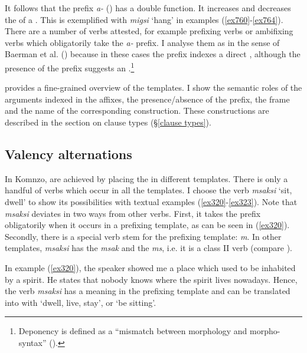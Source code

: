 It follows that the  prefix \emph{a-} (\Vc) has a double function. It increases and decreases the  of a . This is exemplified with \emph{migsi} `hang' in examples (\ref{ex760}-\ref{ex764}). There are a number of  verbs attested, for example prefixing verbs or  ambifixing verbs which obligatorily take the \emph{a-} prefix. I analyse them as  in the sense of Baerman et al. (\citeyear{Baerman:2006depo}) because in these cases the  prefix indexes a direct , although the presence of the {\Vc} prefix suggests an .\footnote{Deponency is defined as a ``mismatch between morphology and morpho-syntax'' (\citealt{Baerman:2006depo}).}

 provides a fine-grained overview of the templates. I show the semantic roles of the arguments indexed in the affixes, the presence/absence of the  prefix, the  frame and the name of the corresponding construction. These constructions are described in the section on clause types (\S\ref{clause types}).

\subsection{Valency alternations} \label{valencyalternations}

In Komnzo,  are achieved by placing the  in different templates. There is only a handful of verbs which occur in all the templates. I choose the verb \emph{msaksi} `sit, dwell' to show its possibilities with textual examples (\ref{ex320}-\ref{ex323}). Note that \emph{msaksi} deviates in two ways from other verbs. First, it takes the  prefix obligatorily when it occurs in a prefixing template, as can be seen in (\ref{ex320}). Secondly, there is a special verb stem for the prefixing template: \emph{m}. In other templates, \emph{msaksi} has the  \emph{msak} and the  \emph{ms}, i.e. it is a class II verb (compare ).

In example (\ref{ex320}), the speaker showed me a place which used to be inhabited by a spirit. He states that nobody knows where the spirit lives nowadays. Hence, the verb \emph{msaksi} has a  meaning in the prefixing template and can be translated into  with `dwell, live, stay', or `be sitting'.

